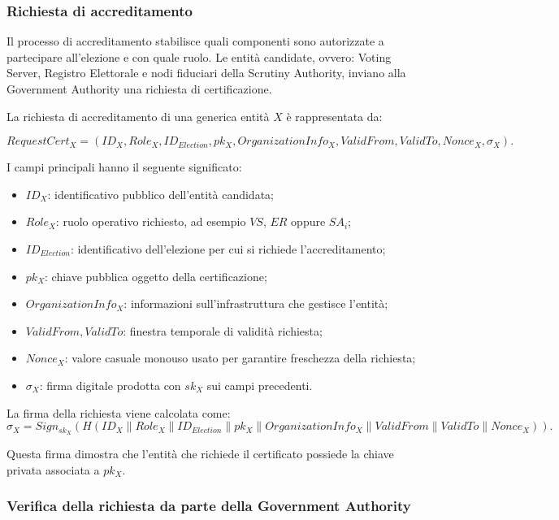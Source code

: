 \documentclass[a4paper,12pt]{article}
\begin{document}
\subsubsection{Richiesta di accreditamento}

Il processo di accreditamento stabilisce quali componenti sono autorizzate a partecipare all'elezione e con quale ruolo. 
Le entit\`a candidate, ovvero: Voting Server, Registro Elettorale e nodi fiduciari della Scrutiny Authority, inviano alla Government Authority una richiesta di certificazione.

La richiesta di accreditamento di una generica entit\`a \(X\) \`e rappresentata da:

\[
	RequestCert_X =
	(ID_X, Role_X, ID_{Election}, pk_X, OrganizationInfo_X, ValidFrom,
    ValidTo, Nonce_X,
    \sigma_X).
\]

I campi principali hanno il seguente significato:

\begin{itemize}
	\item \(ID_X\): identificativo pubblico dell'entit\`a candidata;
	\item \(Role_X\): ruolo operativo richiesto, ad esempio \(VS\), \(ER\) oppure \(SA_i\);
	\item \(ID_{Election}\): identificativo dell'elezione per cui si richiede l'accreditamento;
	\item \(pk_X\): chiave pubblica oggetto della certificazione;
	\item \(OrganizationInfo_X\): informazioni sull'infrastruttura che gestisce l'entit\`a;
	\item \(ValidFrom, ValidTo\): finestra temporale di validit\`a richiesta;
	\item \(Nonce_X\): valore casuale monouso usato per garantire freschezza della richiesta;
	\item \(\sigma_X\): firma digitale prodotta con \(sk_X\) sui campi precedenti.
\end{itemize}

La firma della richiesta viene calcolata come:
\[
	\sigma_X =
	Sign_{sk_X}(H(ID_X \parallel Role_X \parallel ID_{Election} \parallel pk_X \parallel OrganizationInfo_X \parallel ValidFrom \parallel ValidTo \parallel Nonce_X)).
\]

Questa firma dimostra che l'entit\`a che richiede il certificato possiede la chiave privata associata a \(pk_X\).

\subsubsection{Verifica della richiesta da parte della Government Authority}
\end{document}
